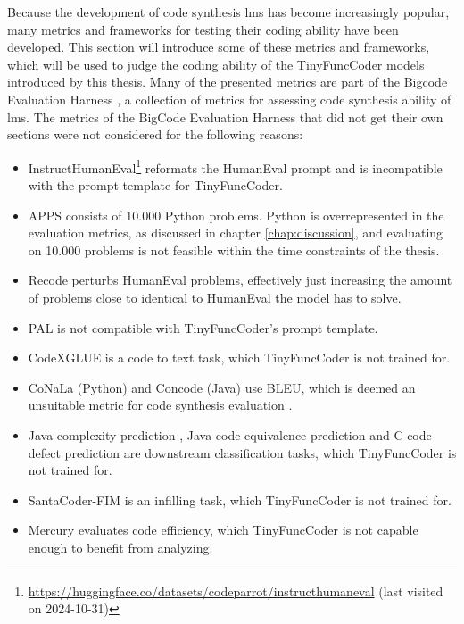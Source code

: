 Because the development of code synthesis \acp{lm} has become increasingly popular, many metrics and frameworks for testing their coding ability have been developed.
This section will introduce some of these metrics and frameworks, which will be used to judge the coding ability of the TinyFuncCoder models introduced by this thesis.
Many of the presented metrics are part of the Bigcode Evaluation Harness \cite{BenAllal.2022}, a collection of metrics for assessing code synthesis ability of \acp{lm}.
The metrics of the BigCode Evaluation Harness that did not get their own sections were not considered for the following reasons:
\begin{itemize}
    \item InstructHumanEval\footnote{\url{https://huggingface.co/datasets/codeparrot/instructhumaneval} (last visited on 2024-10-31)} reformats the HumanEval prompt and is incompatible with the prompt template for TinyFuncCoder.
    \item APPS \cite{Hendrycks.2021} consists of 10.000 Python problems. Python is overrepresented in the evaluation metrics, as discussed in chapter \ref{chap:discussion}, and evaluating on 10.000 problems is not feasible within the time constraints of the thesis.
    \item Recode \cite{Wang.2022} perturbs HumanEval problems, effectively just increasing the amount of problems close to identical to HumanEval the model has to solve.
    \item PAL \cite{Gao.2023} is not compatible with TinyFuncCoder's prompt template.
    \item CodeXGLUE \cite{Lu.2021} is a code to text task, which TinyFuncCoder is not trained for.
    \item CoNaLa (Python) \cite{Yin.2018} and Concode (Java) \cite{Iyer.2018} use BLEU, which is deemed an unsuitable metric for code synthesis evaluation \cite{Chen.2021,Luo.2024}.
    \item Java complexity prediction \cite{Jeon.2023}, Java code equivalence prediction \cite{Svajlenko.2014,Wang.2020} and C code defect prediction \cite{Zhou.2019} are downstream classification tasks, which TinyFuncCoder is not trained for.
    \item SantaCoder-FIM \cite{Allal.2023} is an infilling task, which TinyFuncCoder is not trained for.
    \item Mercury \cite{Du.2024} evaluates code efficiency, which TinyFuncCoder is not capable enough to benefit from analyzing.
\end{itemize}

